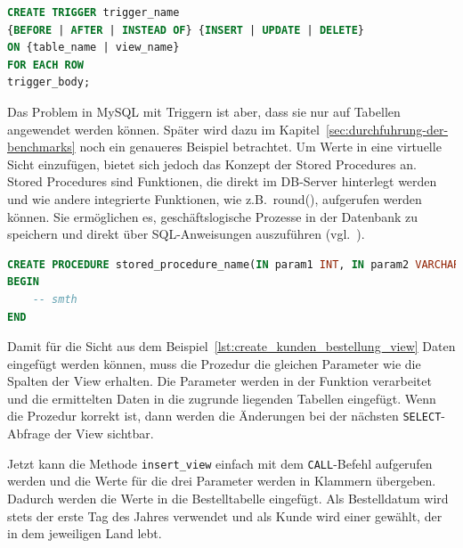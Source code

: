 \vspace{-5pt}
\begin{lstlisting}[language=SQL,caption=Allgemeine Trigger Deklaration,label={lst:allg-trigger-dekl}]
CREATE TRIGGER trigger_name
{BEFORE | AFTER | INSTEAD OF} {INSERT | UPDATE | DELETE}
ON {table_name | view_name}
FOR EACH ROW
trigger_body;
\end{lstlisting}
\vspace{-5pt}

Das Problem in MySQL mit Triggern ist aber, dass sie nur auf Tabellen angewendet werden können.
Später wird dazu im Kapitel~\ref{sec:durchfuhrung-der-benchmarks} noch ein genaueres Beispiel betrachtet.
Um Werte in eine virtuelle Sicht einzufügen, bietet sich jedoch das Konzept der Stored Procedures an.
Stored Procedures sind Funktionen, die direkt im DB-Server hinterlegt werden und wie andere integrierte Funktionen, wie z.B.\ round(), aufgerufen werden können.
Sie ermöglichen es, geschäftslogische Prozesse in der Datenbank zu speichern und direkt über SQL-Anweisungen auszuführen (vgl.\ \cite[S. 173]{silberschatz2011database}).

\vspace{-5pt}
\begin{lstlisting}[language=SQL,caption=Allgemeine Prozedur Deklaration,label={lst:allg-stored-procedure-dekl}]
CREATE PROCEDURE stored_procedure_name(IN param1 INT, IN param2 VARCHAR(255))
BEGIN
    -- smth
END
\end{lstlisting}
\vspace{-5pt}

Damit für die Sicht aus dem Beispiel~\ref{lst:create_kunden_bestellung_view} Daten eingefügt werden können, muss die Prozedur die gleichen Parameter wie die Spalten der View erhalten.
Die Parameter werden in der Funktion verarbeitet und die ermittelten Daten in die zugrunde liegenden Tabellen eingefügt.
Wenn die Prozedur korrekt ist, dann werden die Änderungen bei der nächsten \texttt{SELECT}-Abfrage der View sichtbar.

\vspace{-5pt}


Jetzt kann die Methode \texttt{insert\_view} einfach mit dem \texttt{CALL}-Befehl aufgerufen werden und die Werte für die drei Parameter werden in Klammern übergeben.
Dadurch werden die Werte in die Bestelltabelle eingefügt.
Als Bestelldatum wird stets der erste Tag des Jahres verwendet und als Kunde wird einer gewählt, der in dem jeweiligen Land lebt.

